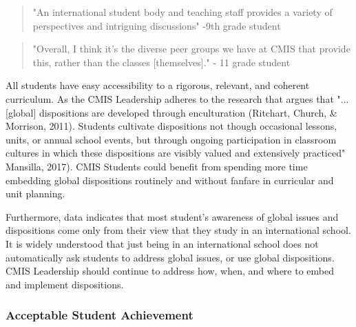 \begin{findings}
\blockquote{"An international student body and teaching staff provides a variety of perspectives and intriguing discussions" -9th grade student}

\blockquote{"Overall, I think it's the diverse peer groups we have at CMIS that provide this, rather than the classes [themselves]." - 11 grade student}


All students have easy accessibility to a rigorous, relevant, and coherent curriculum.  As the CMIS Leadership adheres to the research that argues that   "...[global] dispositions are developed through enculturation (Ritchart, Church, \& Morrison, 2011). Students cultivate dispositions not though occasional lessons, units, or annual school events, but through ongoing participation in classroom cultures in which these dispositions are visibly valued and extensively practiced" Mansilla, 2017). CMIS Students could benefit from spending more time embedding global dispositions routinely and without fanfare in curricular and unit planning. 

Furthermore, data indicates that most student's awareness of global issues and dispositions come only from their view that they study in an international school. It is widely understood that just being in an international school does not automatically ask students to address global issues, or use global dispositions. CMIS Leadership should continue to address how, when, and where to embed and implement dispositions.  
\end{findings}

\subsubsection{Acceptable Student Achievement}




